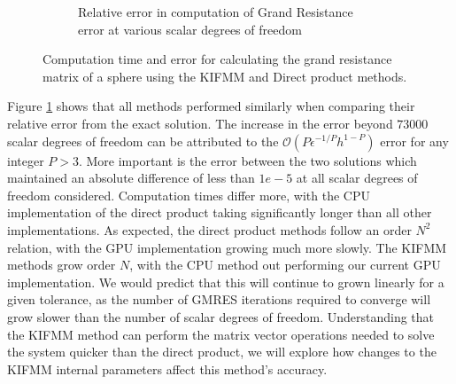 \begin{figure}[ht]
\begin{subfigure}[b]{0.49\textwidth}
         \caption{Relative error in computation of Grand Resistance error at various scalar degrees of freedom}
         \label{fig:DirectProductComperror}
     \end{subfigure}
        \caption{Computation time and error for calculating the grand resistance matrix of a sphere using the KIFMM and Direct product methods.}
        \label{fig:DirectProduct}
\end{figure}

Figure \ref{fig:DirectProductComperror} shows that all methods performed similarly when comparing their relative error from the exact solution. The increase in the error beyond $73000$ scalar degrees of freedom can be attributed to the $\mathcal{O}(P\epsilon^{-1/P} h^{1-P})$ error for any integer $P>3$. More important is the error between the two solutions which maintained an absolute difference of less than $1e-5$ at all scalar degrees of freedom considered. Computation times differ more, with the CPU implementation of the direct product taking significantly longer than all other implementations. As expected, the direct product methods follow an order $N^2$ relation, with the GPU implementation growing much more slowly. The KIFMM methods grow  order $N$, with the CPU method out performing our current GPU implementation. We would predict that this will continue to grown linearly for a given tolerance, as the number of GMRES iterations required to converge will grow slower than the number of scalar degrees of freedom. Understanding that the KIFMM method can perform the matrix vector operations needed to solve the system quicker than the direct product, we will explore how changes to the KIFMM internal parameters affect this method's accuracy. 

